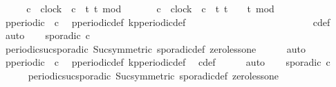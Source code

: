 \begin{isabellebody}
%
\isadelimproof
%
\endisadelimproof
%
\isatagproof
{}\isamarkupfalse%
\ {\isacharminus}\isanewline
\ \ \isamarkupfalse%
\ c\ {\isacharcolon}{\isacharcolon}\ clock\ \ {\isacartoucheopen}c\ {\isacharequal}\ {\isacharparenleft}{\isasymlambda}t{\isachardot}\ t\ mod\ {}\ {\isacharequal}\ {}{\isacharparenright}{\isacartoucheclose}\isanewline
\ \ \isamarkupfalse%
\ c{\isacharprime}\ {\isacharcolon}{\isacharcolon}\ clock\ \ {\isacartoucheopen}c{\isacharprime}\ {\isacharequal}\ {\isacharparenleft}{\isasymlambda}t{\isachardot}\ t\ {\isasymge}\ {}\ {\isasymand}\ {\isacharparenleft}t{\isacharminus}{}{\isacharparenright}\ mod\ {}\ {\isacharequal}\ {}{\isacharparenright}{\isacartoucheclose}\isanewline
\isanewline
\ \ \isamarkupfalse%
\ {\isacartoucheopen}p{\isacharunderscore}periodic\ {}\ c{\isacartoucheclose}\ \isamarkupfalse%
\ p{\isacharunderscore}periodic{\isacharunderscore}def\ kp{\isacharunderscore}periodic{\isacharunderscore}def\isanewline
\ \ \ \ \ \ \ \ \ \ \ \ \ \ \ \ \ \ \ \ \ \ \ \ \isamarkupfalse%
\ c{\isacharunderscore}def\ \isamarkupfalse%
\ auto\isanewline
\ \ \isamarkupfalse%
\ {}{\isacharcolon}{\isacartoucheopen}sporadic\ c{\isacartoucheclose}\isanewline
\ \ \ \ \isamarkupfalse%
\ periodic{\isacharunderscore}suc{\isacharunderscore}sporadic\ Suc{\isacharunderscore}{}{\isacharbrackleft}symmetric{\isacharbrackright}\ sporadic{\isacharunderscore}def\ zero{\isacharunderscore}less{\isacharunderscore}one\isanewline
\ \ \ \ \isamarkupfalse%
\ auto\isanewline
\isanewline
\ \ \isamarkupfalse%
\ {\isacartoucheopen}p{\isacharunderscore}periodic\ {}\ c{\isacharprime}{\isacartoucheclose}\ \isamarkupfalse%
\ p{\isacharunderscore}periodic{\isacharunderscore}def\ kp{\isacharunderscore}periodic{\isacharunderscore}def\ \isamarkupfalse%
\ c{\isacharprime}{\isacharunderscore}def\isanewline
\ \ \ \ \isamarkupfalse%
\ auto\isanewline
\ \ \isamarkupfalse%
\ {}{\isacharcolon}{\isacartoucheopen}sporadic\ c{\isacharprime}{\isacartoucheclose}\isanewline
\ \ \ \ \isamarkupfalse%
\ periodic{\isacharunderscore}suc{\isacharunderscore}sporadic\ Suc{\isacharunderscore}{}{\isacharbrackleft}symmetric{\isacharbrackright}\ sporadic{\isacharunderscore}def\ zero{\isacharunderscore}less{\isacharunderscore}one\isanewline

\end{isabellebody}
